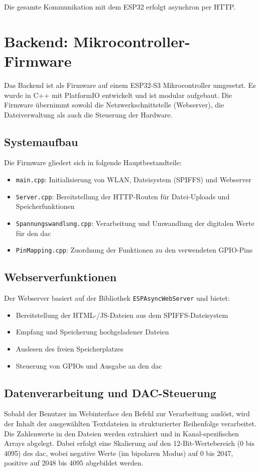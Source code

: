 Die gesamte Kommunikation mit dem ESP32 erfolgt asynchron per HTTP.

\section{Backend: Mikrocontroller-Firmware}

Das Backend ist als Firmware auf einem ESP32-S3 Mikrocontroller umgesetzt. Es wurde in C++ mit PlatformIO entwickelt und ist modular aufgebaut. Die Firmware übernimmt sowohl die Netzwerkschnittstelle (Webserver), die Dateiverwaltung als auch die Steuerung der Hardware.

\subsection{Systemaufbau}
Die Firmware gliedert sich in folgende Hauptbestandteile:

\begin{itemize}
\item \texttt{main.cpp}: Initialisierung von WLAN, Dateisystem (SPIFFS) und Webserver
\item \texttt{Server.cpp}: Bereitstellung der HTTP-Routen für Datei-Uploads und Speicherfunktionen
\item \texttt{Spannungswandlung.cpp}: Verarbeitung und Umwandlung der digitalen Werte für den \gls{dac}
\item \texttt{PinMapping.cpp}: Zuordnung der Funktionen zu den verwendeten GPIO-Pins
\end{itemize}

\subsection{Webserverfunktionen}
Der Webserver basiert auf der Bibliothek \texttt{ESPAsyncWebServer} und bietet:

\begin{itemize}
\item Bereitstellung der HTML-/JS-Dateien aus dem SPIFFS-Dateisystem
\item Empfang und Speicherung hochgeladener Dateien
\item Auslesen des freien Speicherplatzes
\item Steuerung von GPIOs und Ausgabe an den \gls{dac}
\end{itemize}

\subsection{Datenverarbeitung und DAC-Steuerung}
Sobald der Benutzer im Webinterface den Befehl zur Verarbeitung auslöst, wird der Inhalt der ausgewählten Textdateien in strukturierter Reihenfolge verarbeitet. Die Zahlenwerte in den Dateien werden extrahiert und in Kanal-spezifischen Arrays abgelegt. Dabei erfolgt eine Skalierung auf den 12-Bit-Wertebereich (0 bis 4095) des \gls{dac}, wobei negative Werte (im bipolaren Modus) auf 0 bis 2047, positive auf 2048 bis 4095 abgebildet werden.

